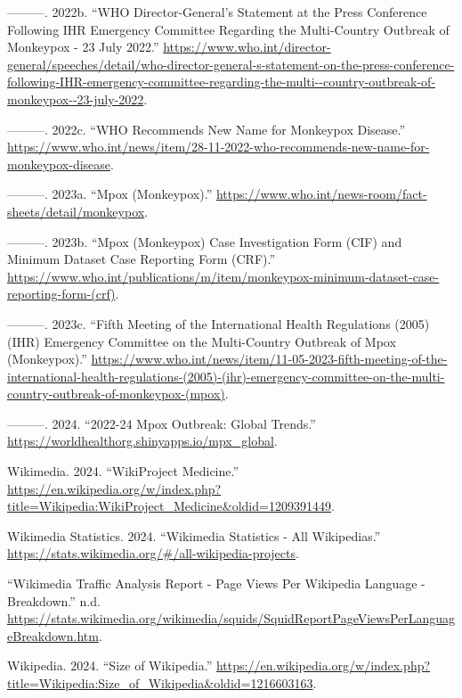 \documentclass[
  12pt,
]{article}
\newlength{\cslhangindent}
\newenvironment{CSLReferences}[2] %
 {\begin{list}{}{%
  \setlength{\itemindent}{0pt}
  \setlength{\leftmargin}{0pt}
  \setlength{\parsep}{0pt}
  \ifodd #1
   \setlength{\leftmargin}{\cslhangindent}
   \setlength{\itemindent}{-1\cslhangindent}
  \fi
  \setlength{\itemsep}{#2\baselineskip}}}
 {\end{list}}
\begin{document}
\begin{CSLReferences}{1}{0}
---------. 2022b. {``WHO Director-General's Statement at the Press
Conference Following IHR Emergency Committee Regarding the Multi-Country
Outbreak of Monkeypox - 23 July 2022.''}
\url{https://www.who.int/director-general/speeches/detail/who-director-general-s-statement-on-the-press-conference-following-IHR-emergency-committee-regarding-the-multi--country-outbreak-of-monkeypox--23-july-2022}.

---------. 2022c. {``WHO Recommends New Name for Monkeypox Disease.''}
\url{https://www.who.int/news/item/28-11-2022-who-recommends-new-name-for-monkeypox-disease}.

---------. 2023a. {``Mpox (Monkeypox).''}
\url{https://www.who.int/news-room/fact-sheets/detail/monkeypox}.

---------. 2023b. {``Mpox (Monkeypox) Case Investigation Form (CIF) and
Minimum Dataset Case Reporting Form (CRF).''}
\url{https://www.who.int/publications/m/item/monkeypox-minimum-dataset-case-reporting-form-(crf)}.

---------. 2023c. {``Fifth Meeting of the International Health
Regulations (2005) (IHR) Emergency Committee on the Multi-Country
Outbreak of Mpox (Monkeypox).''}
\url{https://www.who.int/news/item/11-05-2023-fifth-meeting-of-the-international-health-regulations-(2005)-(ihr)-emergency-committee-on-the-multi-country-outbreak-of-monkeypox-(mpox)}.

---------. 2024. {``2022-24 Mpox Outbreak: Global Trends.''}
\url{https://worldhealthorg.shinyapps.io/mpx_global}.

Wikimedia. 2024. {``WikiProject Medicine.''}
\url{https://en.wikipedia.org/w/index.php?title=Wikipedia:WikiProject_Medicine&oldid=1209391449}.

Wikimedia Statistics. 2024. {``Wikimedia Statistics - All Wikipedias.''}
\url{https://stats.wikimedia.org/\#/all-wikipedia-projects}.

{``Wikimedia Traffic Analysis Report - Page Views Per Wikipedia Language
- Breakdown.''} n.d.
\url{https://stats.wikimedia.org/wikimedia/squids/SquidReportPageViewsPerLanguageBreakdown.htm}.

Wikipedia. 2024. {``Size of Wikipedia.''}
\url{https://en.wikipedia.org/w/index.php?title=Wikipedia:Size_of_Wikipedia&oldid=1216603163}.


\end{CSLReferences}
\end{document}
